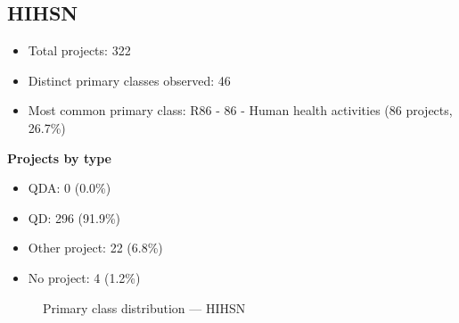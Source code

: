 \subsection{HIHSN}

\begin{itemize}
    \item Total projects: 322
    \item Distinct primary classes observed: 46
    \item Most common primary class: R86 - 86 - Human health activities (86 projects, 26.7\%)
\end{itemize}
\textbf{Projects by type}
\begin{itemize}
    \item QDA: 0 (0.0\%)
    \item QD: 296 (91.9\%)
    \item Other project: 22 (6.8\%)
    \item No project: 4 (1.2\%)
\end{itemize}

\begin{figure}[H]
    \centering
    
    \caption{Primary class distribution --- HIHSN}
\end{figure}

